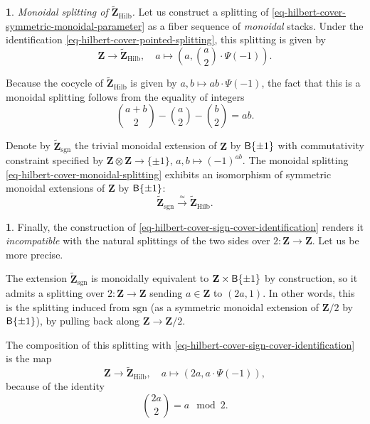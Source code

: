 \documentclass[10pt,english,reqno]{amsart}
\newcommand{\integers}{\mathbf Z}
\newcommand{\deloop}{\textnormal{\textsf{B}}}
\newcommand{\sgn}{\mathrm{sgn}}
\newcommand{\Hilbert}{\mathrm{Hilb}}
\theoremstyle{definition}
\numberwithin{equation}{section}
\newtheorem{untitledsubsubsection}[subsubsection]{}
\newenvironment{void}
{\begin{untitledsubsubsection}}
{\end{untitledsubsubsection}}
\begin{document}
\begin{void}\emph{Monoidal splitting of $\widetilde{\integers}_{\Hilbert}$.}
\label{void-hilbert-cover-monoidal-splitting}
Let us construct a splitting of \eqref{eq-hilbert-cover-symmetric-monoidal-parameter} as a fiber sequence of \emph{monoidal} stacks. Under the identification \eqref{eq-hilbert-cover-pointed-splitting}, this splitting is given by
\begin{equation}
\label{eq-hilbert-cover-monoidal-splitting}
\integers \rightarrow \widetilde{\integers}_{\Hilbert},\quad
a\mapsto (a, \binom{a}{2}\cdot\Psi(-1)).
\end{equation}

Because the cocycle of $\widetilde{\integers}_{\Hilbert}$ is given by $a, b\mapsto ab\cdot \Psi(-1)$, the fact that this is a monoidal splitting follows from the equality of integers
$$
\binom{a + b}{2} - \binom{a}{2} - \binom{b}{2} = ab.
$$

Denote by $\widetilde{\integers}_{\sgn}$ the trivial monoidal extension of $\integers$ by $\deloop\{\pm 1\}$ with commutativity constraint specified by $\integers \otimes\integers \rightarrow \{\pm 1\}$, $a, b\mapsto (-1)^{ab}$. The monoidal splitting \eqref{eq-hilbert-cover-monoidal-splitting} exhibits an isomorphism of symmetric monoidal extensions of $\integers$ by $\deloop\{\pm 1\}$:
\begin{equation}
\label{eq-hilbert-cover-sign-cover-identification}
\widetilde{\integers}_{\sgn} \xrightarrow{\simeq} \widetilde{\integers}_{\Hilbert}.
\end{equation}
\end{void}


\begin{void}
\label{void-hilbert-cover-square-splitting}
Finally, the construction of \eqref{eq-hilbert-cover-sign-cover-identification} renders it \emph{incompatible} with the natural splittings of the two sides over $2 : \integers \rightarrow \integers$. Let us be more precise.

The extension $\widetilde{\integers}_{\sgn}$ is monoidally equivalent to $\integers \times \deloop\{\pm 1\}$ by construction, so it admits a splitting over $2 : \integers \rightarrow \integers$ sending $a \in \integers$ to $(2a, 1)$. In other words, this is the splitting induced from $\sgn$ (as a symmetric monoidal extension of $\integers/2$ by $\deloop\{\pm 1\}$), by pulling back along $\integers \rightarrow \integers/2$.

The composition of this splitting with \eqref{eq-hilbert-cover-sign-cover-identification} is the map
\begin{equation}
\label{eq-hilbert-cover-square-splitting}
\integers \rightarrow \widetilde{\integers}_{\Hilbert},\quad a\mapsto (2a, a\cdot\Psi(-1)),
\end{equation}
because of the identity
$$
\binom{2a}{2} = a \mod 2.
$$
\end{void}
\end{document}
